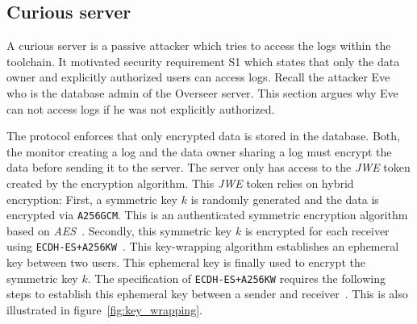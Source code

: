\documentclass[../main.tex]{subfiles}
\begin{document}
\subsection{Curious server}
A curious server is a passive attacker which tries to access the logs within the toolchain.
It motivated security requirement S1 which states that only the data owner and explicitly authorized users can access logs.
Recall the attacker Eve who is the database admin of the Overseer server.
This section argues why Eve can not access logs if he was not explicitly authorized.

The protocol enforces that only encrypted data is stored in the database.
Both, the monitor creating a log and the data owner sharing a log must encrypt the data before sending it to the server.
The server only has access to the \emph{JWE} token created by the encryption algorithm.
This \emph{JWE} token relies on hybrid encryption:
First, a symmetric key $k$ is randomly generated and the data is encrypted via \verb|A256GCM|.
This is an authenticated symmetric encryption algorithm based on \emph{AES}~\cite{Jones2015}.
Secondly, this symmetric key $k$ is encrypted for each receiver using \verb|ECDH-ES+A256KW|~\cite{Jones2015}.
This key-wrapping algorithm establishes an ephemeral key between two users.
This ephemeral key is finally used to encrypt the symmetric key $k$.
The specification of \verb|ECDH-ES+A256KW| requires the following steps to establish this ephemeral key between a sender and receiver~\cite[100]{Barker2017}.
This is also illustrated in figure~\ref{fig:key_wrapping}.
\end{document}
